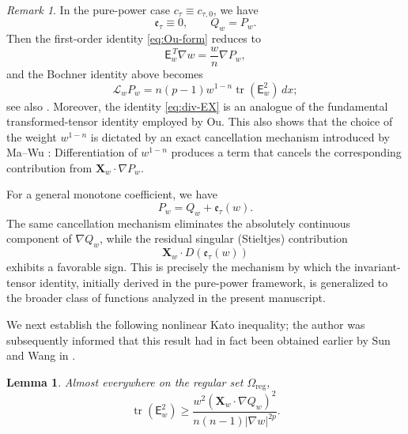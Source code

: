 \documentclass[reqno,12pt]{amsart}
\numberwithin{equation}{section}
\newtheorem{lem}[thm]{Lemma}
\theoremstyle{remark}
\newtheorem{rem}[thm]{Remark}
\newcommand{\tr}{\operatorname{tr}}
\newcommand{\Xbf}{\mathbf X}
\newcommand{\Lscr}{\mathscr L}
\begin{document}
\begin{rem} \label{rem:ou-bochner-comparison}
In the pure-power case $c_\tau \equiv c_{\tau,0}$, we have
$$
\mathfrak e_\tau \equiv 0, \qquad Q_w = P_w.
$$
Then the first-order identity \eqref{eq:Ou-form} reduces to
$$
\mathsf E_w^{\,T}\nabla w = \frac{w}{n}\nabla P_w,
$$
and the Bochner identity above becomes 
$$
\Lscr_w P_w = n(p-1) w^{1-n} \tr(\mathsf E_w^2)\,dx; 
$$
see also \cite[Lemma 2.2, Formula (2.12)]{O2025}.
Moreover, the identity \eqref{eq:div-EX} is an analogue of the fundamental transformed-tensor identity \cite[Lemma 2.1 (iii)]{O2025} employed by Ou. 
This also shows that the choice of the weight $w^{1-n}$ is dictated by an exact cancellation mechanism introduced by Ma--Wu \cite{MW2024}: Differentiation of $w^{1-n}$ produces a term that cancels the corresponding contribution from $\Xbf_w \cdot \nabla P_w$.

For a general monotone coefficient, we have
$$
P_w = Q_w + \mathfrak e_\tau(w).
$$
The same cancellation mechanism eliminates the absolutely continuous component of $\nabla Q_w$, while the residual singular (Stieltjes) contribution
$$
\Xbf_w \cdot D(\mathfrak e_\tau(w))
$$
exhibits a favorable sign. This is precisely the mechanism by which the invariant-tensor identity, initially derived in the pure-power framework, is generalized to the broader class of functions analyzed in the present manuscript.
\end{rem}

We next establish the following nonlinear Kato inequality; the author was subsequently informed that this result had in fact been obtained earlier by Sun and Wang in \cite[Lemma 2.1 (3)]{SW2025}.

\begin{lem} \label{lem:rayleigh}
Almost everywhere on the regular set $\Omega_{\mathrm{reg}}$,
\begin{equation}\label{eq:rayleigh}
 \tr(\mathsf E_w^2) \ge  \frac{w^2(\Xbf_w\cdot\nabla Q_w)^2}  {n(n-1)|\nabla w|^{2p}}.
\end{equation}
\end{lem}
\end{document}
